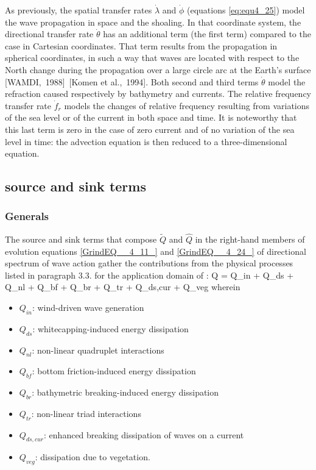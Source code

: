  As previously, the spatial transfer rates $\dot{\lambda }$ and $\dot{\phi }$ (equations \ref{eq:equ4_25}) model the wave propagation in space and the shoaling. In that coordinate system, the directional transfer rate $\dot{\theta }$ has an additional term (the first term) compared to the case in Cartesian coordinates. That term results from the propagation in spherical coordinates, in such a way that waves are located with respect to the North change during the propagation over a large circle arc at the Earth's surface [WAMDI,~1988]~[Komen et al.,~1994]. Both second and third terms $\dot{\theta }$ model the refraction caused respectively by bathymetry and currents. The relative frequency transfer rate $\dot{f}_{r} $  models the changes of relative frequency resulting from variations of the sea level or of the current in both space and time. It is noteworthy that this last term is zero in the case of zero current and of no variation of the sea level in time: the advection equation is then reduced to a three-dimensional equation.


\subsection{ \tomawac source and sink terms}
\label{se:sourceterm}

\subsubsection{ Generals}

 The source and sink terms that compose $\tilde{Q}$ and $\hat{Q}$ in the right-hand members of evolution equations \eqref{GrindEQ__4_11_} and \eqref{GrindEQ__4_24_} of directional spectrum of wave action gather the contributions from the physical processes listed in paragraph 3.3. for the application domain of \tomawac:
\bequ
\label{eq:semimp}
 Q = Q_{in} + Q_{ds} + Q_{nl} + Q_{bf} + Q_{br} + Q_{tr} + Q_{ds,cur} + Q_{veg}
\eequ
 wherein 
\begin{itemize}
\item $Q_{in}$: wind-driven wave generation
\item $Q_{ds}$: whitecapping-induced energy dissipation
\item $Q_{nl}$: non-linear quadruplet interactions
\item $Q_{bf}$: bottom friction-induced energy dissipation
\item $Q_{br}$: bathymetric breaking-induced energy dissipation
\item $Q_{tr}$: non-linear triad interactions
\item $Q_{ds,cur}$: enhanced breaking dissipation of waves on a current
\item $Q_{veg}$: dissipation due to vegetation.
\end{itemize}

